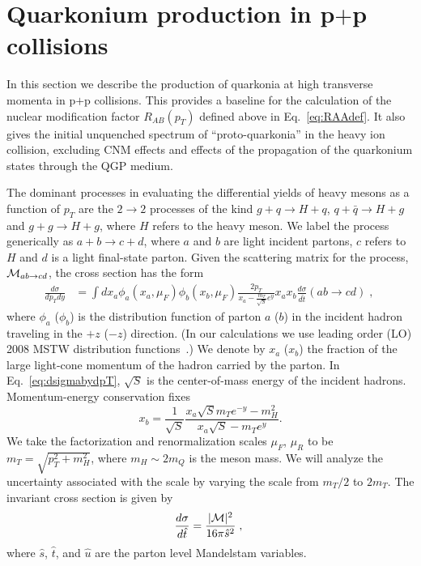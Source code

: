 \documentclass[article,showpacs,preprintnumbers,amsmath,amssymb]{revtex4}
\newcommand{\hatt}{\hat{t}}
\newcommand{\hats}{\hat{s}}
\begin{document}
\section{Quarkonium production in p$+$p collisions~\label{section:ppProduction}}

In this section we describe the production of quarkonia at high transverse
momenta in p$+$p collisions. This provides a baseline for the calculation of
the nuclear modification factor $R_{AB} (p_T)$ defined above in
Eq.~\ref{eq:RAAdef}.  It also gives the initial unquenched spectrum of
``proto-quarkonia'' in the heavy ion collision, excluding CNM effects and
effects of the propagation of the quarkonium states through the QGP  medium.

The dominant processes in evaluating the differential yields of heavy mesons 
as a function of $p_T$ are the $2\rightarrow 2$
processes of the kind $g+q\rightarrow H+q$, $q+\bar{q}\rightarrow H+g$ and
$g+g\rightarrow H+g$, where $H$ refers to the heavy meson. We label the process
generically as $a+b\rightarrow c+d$, where $a$ and $b$ are light incident
partons, $c$ refers to $H$ and $d$ is a light final-state parton. Given the 
scattering matrix for the process, ${\cal{M}}_{ab\rightarrow cd}$, the cross section has
the form
\begin{equation}
\begin{split}
\frac{d\sigma}{dp_Tdy} &= \int dx_a \phi_{a}(x_a, \mu_F)\phi_{b}(x_b, \mu_F) 
\frac{2p_T}{x_a-\frac{m_T}{\sqrt{S}}e^{y}} x_a x_b
\frac{d\sigma}{d\hatt}(ab\rightarrow cd)\;,~\label{eq:dsigmabydpT}
\end{split}
\end{equation}
where $\phi_a$ ($\phi_b$) is the distribution function of  parton $a$ ($b$) in
the incident hadron traveling in the $+z$ ($-z$) direction. (In our
calculations we use leading order (LO) 2008 MSTW distribution 
functions~\cite{MSTW}.) We denote by $x_a$ ($x_b$)  the fraction of the large light-cone  momentum of the hadron 
carried by the parton. In Eq.~\ref{eq:dsigmabydpT}, $\sqrt{S}$ is the  center-of-mass energy of the
incident hadrons. Momentum-energy conservation fixes
\begin{equation}
x_b = \frac{1}{\sqrt{S}}
\frac{x_a\sqrt{S}m_Te^{-y}-m_H^2}{x_a\sqrt{S}-m_T e^{y}}.
\end{equation}
We take the factorization and renormalization scales $\mu_F$, $\mu_R$ to be
$m_T=\sqrt{p_T^2+m_H^2}$, where $m_H\sim2m_Q$ is the meson mass. We will
analyze the uncertainty associated with the scale by varying the scale from
$m_T/2$ to $2m_T$. The invariant cross section is given by 
\begin{equation}
\frac{d\sigma}{d\hatt} = \frac{|{\cal{M}}|^2}{16\pi\hats^2}\;,
~\label{eq:dsigmavsMsq}
\end{equation}
where $\hat{s}$, $\hat{t}$, and $\hat{u}$ are the parton level 
Mandelstam variables.
\end{document}
